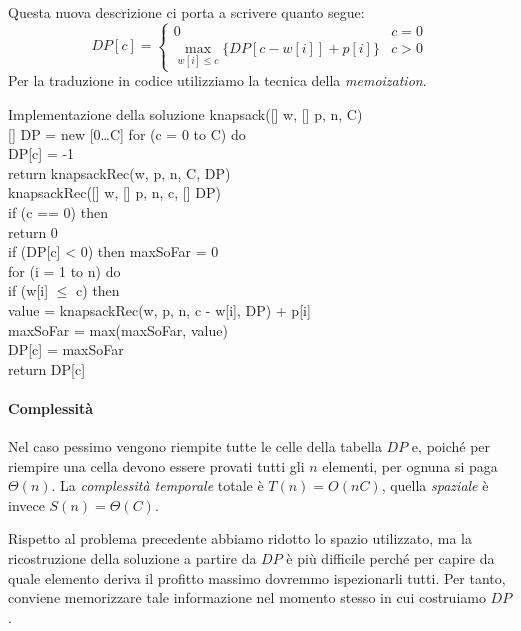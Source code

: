 Questa nuova descrizione ci porta a scrivere quanto segue:
\[DP[c]=\begin{cases}
    0 & c=0\\
    \max_{w[i]\leq c}\{DP[c-w[i]]+p[i]\} & c > 0
\end{cases}\]
Per la traduzione in codice utilizziamo la tecnica della \emph{memoization}.
\begin{minicode}{Implementazione della soluzione}
\ind{} knapsack([] w, [] p,  n,  C)\\
    [] DP = new [0\dots C]\hfill{}
    \indf for (c = 0 to C) do\\
        DP[c] = -1\\
    \indf return knapsackRec(w, p, n, C, DP)\\

\ind{} knapsackRec([] w, [] p,  n,  c,
[] DP)\\
    \indf if (c == 0) then\\
        return 0\\
    \indf if (DP[c] < 0) then\hfill{}
         maxSoFar = 0\\
        \indff for (i = 1 to n) do\\
            \indfff if (w[i] $\leq$ c) then\\
                 value = knapsackRec(w, p, n, c - w[i], DP) + p[i]\\
                maxSoFar = max(maxSoFar, value)\\
        \indff DP[c] = maxSoFar\\
    \indf return DP[c]
\end{minicode}

\paragraph{Complessità}
Nel caso pessimo vengono riempite tutte le celle della tabella $DP$ e, poiché
per riempire una cella devono essere provati tutti gli $n$ elementi, per
ognuna si paga $\Theta(n)$. La \emph{complessità temporale} totale è $T(n)=O(nC)$,
quella \emph{spaziale} è invece $S(n)=\Theta(C)$.

Rispetto al problema precedente abbiamo ridotto lo spazio utilizzato, ma la
ricostruzione della soluzione a partire da $DP$ è più difficile perché per
capire da quale elemento deriva il profitto massimo dovremmo ispezionarli
tutti. Per tanto, conviene memorizzare tale informazione nel momento stesso
in cui costruiamo $DP$.


